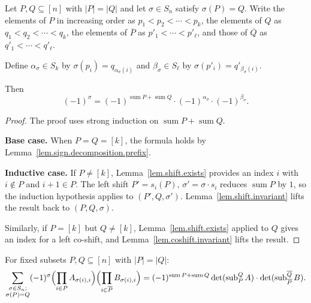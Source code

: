 \begin{lemma}
\label{lem.sign.decomposition}
\leanhelper
\leanok
Let $P,Q\subseteq [n]$ with $|P|=|Q|$ and let $\sigma\in S_n$ satisfy
$\sigma(P)=Q$. Write the elements of $P$ in increasing order as
$p_1<p_2<\cdots<p_k$, the elements of $Q$ as $q_1<q_2<\cdots<q_k$,
the elements of $\overline{P}$ as $p'_1<\cdots<p'_{\ell}$, and those
of $\overline{Q}$ as $q'_1<\cdots<q'_{\ell}$.

Define $\alpha_{\sigma}\in S_k$ by $\sigma(p_i) = q_{\alpha_{\sigma}(i)}$
and $\beta_{\sigma}\in S_{\ell}$ by
$\sigma(p'_i) = q'_{\beta_{\sigma}(i)}$.

Then
\[
(-1)^{\sigma} = (-1)^{\operatorname{sum} P + \operatorname{sum} Q}
\cdot (-1)^{\alpha_{\sigma}} \cdot (-1)^{\beta_{\sigma}}.
\]
\end{lemma}

\begin{proof}
The proof uses strong induction on
$\operatorname{sum} P + \operatorname{sum} Q$.

\textbf{Base case.}
When $P = Q = [k]$, the formula holds by
Lemma~\ref{lem.sign.decomposition.prefix}.

\textbf{Inductive case.}
If $P \ne [k]$, Lemma~\ref{lem.shift.exists} provides an index $i$
with $i\notin P$ and $i+1\in P$.  The left shift
$P' = s_i(P)$, $\sigma' = \sigma\cdot s_i$
reduces $\operatorname{sum} P$ by $1$, so the induction hypothesis
applies to $(P', Q, \sigma')$.
Lemma~\ref{lem.shift.invariant} lifts the result back to $(P, Q, \sigma)$.

Similarly, if $P = [k]$ but $Q \ne [k]$,
Lemma~\ref{lem.shift.exists} applied to $Q$ gives an index for a
left co-shift, and Lemma~\ref{lem.coshift.invariant} lifts the result.
\end{proof}

\begin{lemma}
\label{lem.det.sumPQ}
\leanhelper
\leanok
For fixed subsets $P,Q\subseteq [n]$ with $|P|=|Q|$:
\[
\sum_{\substack{\sigma\in S_n;\\ \sigma(P)=Q}}
(-1)^{\sigma}
\Bigl(\prod_{i\in P} A_{\sigma(i),i}\Bigr)
\Bigl(\prod_{i\in \overline{P}} B_{\sigma(i),i}\Bigr)
= (-1)^{\operatorname{sum} P + \operatorname{sum} Q}
\det(\operatorname{sub}_P^Q A)
\cdot \det(\operatorname{sub}_{\overline{P}}^{\overline{Q}} B).
\]
\end{lemma}


